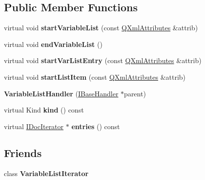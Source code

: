 \subsection*{Public Member Functions}
\begin{DoxyCompactItemize}
\item 
\mbox{\label{class_variable_list_handler_a523965fbe03792f499c4a70ff56ff154}} 
virtual void {\bfseries start\+Variable\+List} (const \mbox{\hyperlink{class_q_xml_attributes}{Q\+Xml\+Attributes}} \&attrib)
\item 
\mbox{\label{class_variable_list_handler_a32f854c7ccf227941bf0de629e9fa3eb}} 
virtual void {\bfseries end\+Variable\+List} ()
\item 
\mbox{\label{class_variable_list_handler_aeaba3b6193c383a56b267aa434319b7b}} 
virtual void {\bfseries start\+Var\+List\+Entry} (const \mbox{\hyperlink{class_q_xml_attributes}{Q\+Xml\+Attributes}} \&attrib)
\item 
\mbox{\label{class_variable_list_handler_a041c0bb4ece0e231cc9f0fadc7012613}} 
virtual void {\bfseries start\+List\+Item} (const \mbox{\hyperlink{class_q_xml_attributes}{Q\+Xml\+Attributes}} \&attrib)
\item 
\mbox{\label{class_variable_list_handler_aa23a7af1c77a52ad2b873b5273988a5b}} 
{\bfseries Variable\+List\+Handler} (\mbox{\hyperlink{class_i_base_handler}{I\+Base\+Handler}} $\ast$parent)
\item 
\mbox{\label{class_variable_list_handler_a5480211f636439ab1475d0fd1e3a0d7b}} 
virtual Kind {\bfseries kind} () const
\item 
\mbox{\label{class_variable_list_handler_a1ff497581aac56ed5e1c3ed24b2ee8e2}} 
virtual \mbox{\hyperlink{class_i_doc_iterator}{I\+Doc\+Iterator}} $\ast$ {\bfseries entries} () const
\end{DoxyCompactItemize}
\subsection*{Friends}
\begin{DoxyCompactItemize}
\item 
\mbox{\label{class_variable_list_handler_a8c090f1bc8d2b072a4be8ce5b4571421}} 
class {\bfseries Variable\+List\+Iterator}
\end{DoxyCompactItemize}
